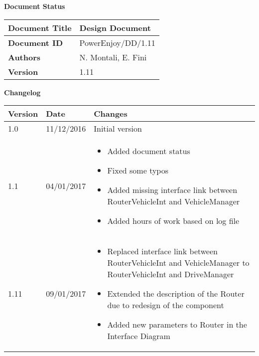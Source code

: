 \textbf{\Huge Document Status}
\begin{center}
    \begin{tabular}{ | l | p{10cm} |}
    \hline
    \textbf{Document Title} & Design Document \\ \hline
    \textbf{Document ID} & PowerEnjoy/DD/1.11 \\ \hline
    \textbf{Authors} & N. Montali, E. Fini \\ \hline
    \textbf{Version} & 1.11 \\ \hline
    \end{tabular}
\textbf{\Large Changelog}
     \begin{tabular}{ | l | l | p{10cm} |}
    \hline
    \textbf{Version} & \textbf{Date} & \textbf{Changes} \\ \hline
    1.0 & 11/12/2016 & Initial version \\ \hline
    1.1 & 04/01/2017 & \begin{itemize}
    	\item Added document status 
	\item Fixed some typos
	\item Added missing interface link between RouterVehicleInt and VehicleManager
	\item Added hours of work based on log file
    \end{itemize}
    \\ \hline
    1.11 & 09/01/2017 & \begin{itemize}
	\item Replaced interface link between RouterVehicleInt and VehicleManager to RouterVehicleInt and DriveManager
	\item Extended the description of the Router due to redesign of the component
	\item Added new parameters to Router in the Interface Diagram 
    \end{itemize}
    \\ \hline
    \end{tabular}
\end{center}